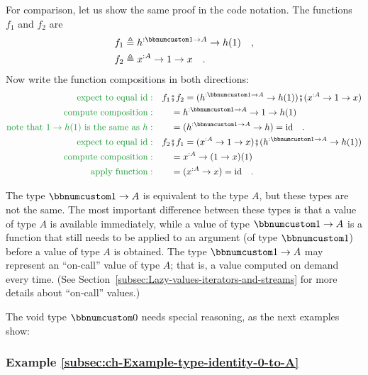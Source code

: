 For comparison, let us show the same proof in the code notation. The
functions $f_{1}$ and $f_{2}$ are 
\begin{align*}
 & f_{1}\triangleq h^{:\bbnum 1\rightarrow A}\rightarrow h(1)\quad,\\
 & f_{2}\triangleq x^{:A}\rightarrow1\rightarrow x\quad.
\end{align*}
Now write the function compositions in both directions:
\begin{align*}
{\color{greenunder}\text{expect to equal }\text{id}:}\quad & f_{1}\bef f_{2}=(h^{:\bbnum 1\rightarrow A}\rightarrow h(1))\bef(x^{:A}\rightarrow1\rightarrow x)\\
{\color{greenunder}\text{compute composition}:}\quad & \quad=h^{:\bbnum 1\rightarrow A}\rightarrow1\rightarrow h(1)\\
{\color{greenunder}\text{note that }1\rightarrow h(1)\text{ is the same as }h:}\quad & \quad=(h^{:\bbnum 1\rightarrow A}\rightarrow h)=\text{id}\quad.\\
{\color{greenunder}\text{expect to equal }\text{id}:}\quad & f_{2}\bef f_{1}=(x^{:A}\rightarrow1\rightarrow x)\bef(h^{:\bbnum 1\rightarrow A}\rightarrow h(1))\\
{\color{greenunder}\text{compute composition}:}\quad & \quad=x^{:A}\rightarrow(1\rightarrow x)(1)\\
{\color{greenunder}\text{apply function}:}\quad & \quad=(x^{:A}\rightarrow x)=\text{id}\quad.
\end{align*}

The type $\bbnum 1\rightarrow A$ is equivalent to the type $A$,
but these types are not the same. The most important difference between
these types is that a value of type $A$ is available immediately,
while a value of type $\bbnum 1\rightarrow A$ is a function that
still needs to be applied to an argument (of type $\bbnum 1$) before
a value of type $A$ is obtained. The type $\bbnum 1\rightarrow A$
may represent an \textsf{``}on-call\textsf{''} value of type
$A$; that is, a value computed on demand every time. (See Section~\ref{subsec:Lazy-values-iterators-and-streams}
for more details about \textsf{``}on-call\textsf{''} values.)

The void type $\bbnum 0$ needs special reasoning,
as the next examples show:

\subsubsection{Example \label{subsec:ch-Example-type-identity-0-to-A}\ref{subsec:ch-Example-type-identity-0-to-A}}

